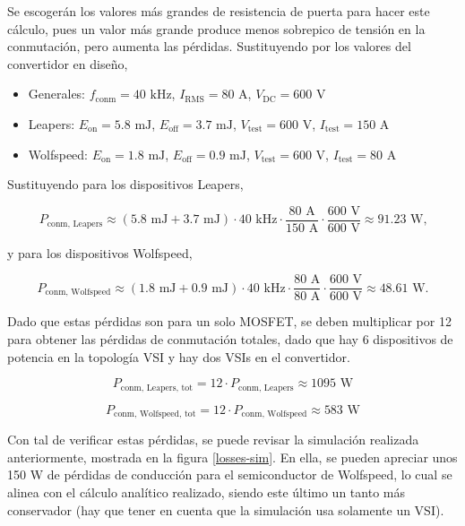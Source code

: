 Se escogerán los valores más grandes de resistencia de puerta para hacer este cálculo, pues un valor más grande produce menos sobrepico de tensión en la conmutación, pero aumenta las pérdidas. Sustituyendo por los valores del convertidor en diseño,

\begin{itemize}
	\item Generales: \(f_{\text{conm}} = 40 \text{ kHz}\), \(I_{\text{RMS}} = 80 \text{ A}\), \(V_{\text{DC}} = 600 \text{ V}\)
	\item Leapers: \(E_{\text{on}} = 5.8 \text{ mJ}\), \(E_{\text{off}} = 3.7 \text{ mJ}\), \(V_{\text{test}} = 600 \text{ V}\), \(I_{\text{test}} = 150 \text{ A}\)
	\item Wolfspeed: \(E_{\text{on}} = 1.8 \text{ mJ}\), \(E_{\text{off}} = 0.9 \text{ mJ}\), \(V_{\text{test}} = 600 \text{ V}\), \(I_{\text{test}} = 80 \text{ A}\)
\end{itemize}

Sustituyendo para los dispositivos Leapers,

\[
P_{\text{conm, Leapers}} \approx (5.8 \text{ mJ} + 3.7 \text{ mJ}) \cdot 40 \text{ kHz} \cdot \frac{80 \text{ A}}{150 \text{ A}} \cdot \frac{600 \text{ V}}{600 \text{ V}} \approx 91.23 \text{ W,}
\]

y para los dispositivos Wolfspeed,

\[
P_{\text{conm, Wolfspeed}} \approx (1.8 \text{ mJ} + 0.9 \text{ mJ}) \cdot 40 \text{ kHz} \cdot \frac{80  \text{ A}}{80 \text{ A}} \cdot \frac{600 \text{ V}}{600 \text{ V}} \approx 48.61 \text{ W.}
\]

Dado que estas pérdidas son para un solo MOSFET, se deben multiplicar por 12 para obtener las pérdidas de conmutación totales, dado que hay 6 dispositivos de potencia en la topología VSI y hay dos VSIs en el convertidor.

\[
P_{\text{conm, Leapers, tot}} = 12\cdot P_{\text{conm, Leapers}} \approx 1095 \text{ W}
\]

\[
P_{\text{conm, Wolfspeed, tot}} = 12\cdot P_{\text{conm, Wolfspeed}} \approx 583 \text{ W}
\]

Con tal de verificar estas pérdidas, se puede revisar la simulación realizada anteriormente, mostrada en la figura \ref{losses-sim}. En ella, se pueden apreciar unos 150 W de pérdidas de conducción para el semiconductor de Wolfspeed, lo cual se alinea con el cálculo analítico realizado, siendo este último un tanto más conservador (hay que tener en cuenta que la simulación usa solamente un VSI). 

